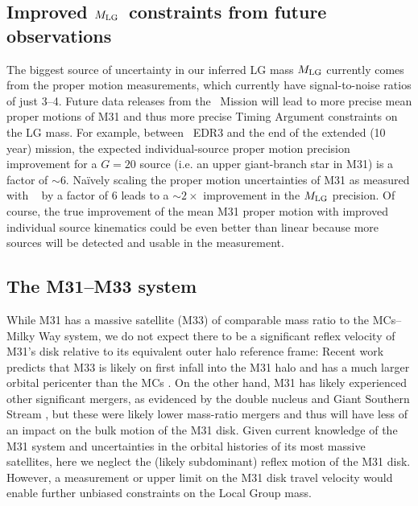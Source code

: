 \documentclass[twocolumn]{aastex631}
\newcommand{\mlg}{\ensuremath{M_{\rm LG}}}
\begin{document}
\subsection{Improved \mlg\ constraints from future observations}

The biggest source of uncertainty in our inferred LG mass $\mlg$ currently comes
from the proper motion measurements, which currently have signal-to-noise ratios
of just 3--4.
Future data releases from the \gaia\ Mission \citep{GaiaOverview2016} will lead
to more precise mean proper motions of M31 and thus more precise Timing Argument
constraints on the LG mass.
For example, between \gaia\ EDR3 and the end of the extended (10 year) mission,
the expected individual-source proper motion precision improvement for a $G=20$
source (i.e. an upper giant-branch star in M31) is a factor of $\sim$6.
Na\"ively scaling the proper motion uncertainties of M31 as measured with \gaia\
\citep{Salomon2021} by a factor of 6 leads to a $\sim2\times$ improvement in the
$\mlg$ precision.
Of course, the true improvement of the mean M31 proper motion with improved
individual source kinematics could be even better than linear because more
sources will be detected and usable in the measurement.


\subsection{The M31--M33 system}

While M31 has a massive satellite (M33) of comparable mass ratio to the
MCs--Milky Way system, we do not expect there to be a significant reflex
velocity of M31's disk relative to its equivalent outer halo reference frame:
Recent work predicts that M33 is likely on first infall into the M31 halo and
has a much larger orbital pericenter than the MCs \citep[e.g.,][]{Patel2017a}.
On the other hand, M31 has likely experienced other significant mergers, as
evidenced by the double nucleus and Giant Southern Stream \citep{TODO} \todo{GSS
reference?}, but these were likely lower mass-ratio mergers and thus will have
less of an impact on the bulk motion of the M31 disk.
Given current knowledge of the M31 system and uncertainties in the orbital
histories of its most massive satellites, here we neglect the (likely
subdominant) reflex motion of the M31 disk.
However, a measurement or upper limit on the M31 disk travel velocity would
enable further unbiased constraints on the Local Group mass.

\end{document}

